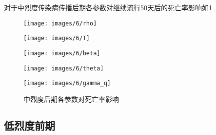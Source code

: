 \documentclass[withoutpreface,bwprint]{cumcmthesis}
\begin{document}
对于中烈度传染病传播后期各参数对继续流行50天后的死亡率影响如\cref{fig:11}
\begin{figure}[H]
    \centering
    \begin{minipage}[c]{0.3\textwidth}
        \centering
        \texttt{[image: images/6/rho]}
        \subcaption{$\rho$}
    \end{minipage}
    \begin{minipage}[c]{0.3\textwidth}
        \centering
        \texttt{[image: images/6/T]}
    \end{minipage}
    \begin{minipage}[c]{0.3\textwidth}
        \centering
        \texttt{[image: images/6/beta]}
        \subcaption{$\beta$}
    \end{minipage}

    \begin{minipage}[c]{0.3\textwidth}
        \centering
        \texttt{[image: images/6/theta]}
        \subcaption{$\theta$}
    \end{minipage}
    \begin{minipage}[c]{0.3\textwidth}
        \centering
        \texttt{[image: images/6/gamma\_q]}
    \end{minipage}
    \caption{中烈度后期各参数对死亡率影响}
    \label{fig:11}
    
\end{figure}

\subsection{低烈度前期}
\end{document}

